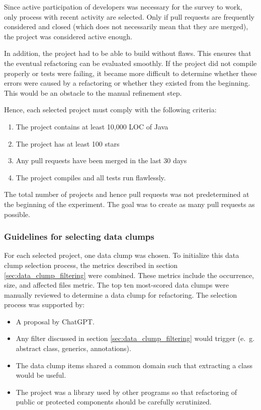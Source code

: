 Since active participation of developers was necessary for the survey to work, only process with recent activity are selected. Only if pull requests are frequently considered and closed (which does not necessarily mean that they are merged), the project was considered active enough. 

In addition, the project had to be able to build without flaws. This ensures that the eventual refactoring can be evaluated smoothly. If the project did not compile properly or tests were failing, it became more difficult to determine whether these errors were caused by a refactoring or whether they existed from the beginning. This would be an obstacle to the manual refinement step.


Hence, each selected project must comply with the following criteria:
\begin{enumerate}
    \item The project contains at least  10,000 \ac{LOC} of Java
        \item The project  has at least 100 stars
\item Any pull requests have been merged in the last 30 days
\item The project compiles and all tests run flawlessly.
\end{enumerate}


The total number of projects and hence pull requests was not predetermined at the beginning of the experiment. The goal was to create as many pull requests as possible. 


\subsubsection{Guidelines for selecting data clumps}

For each selected project, one data clump was chosen. To initialize this data clump selection process, the metrics described in section \ref{sec:data_clump_filtering} were combined. These metrics include the occurrence, size, and affected files metric. The top ten most-scored data clumps were manually reviewed to determine a data clump for refactoring. The selection process was supported by:
\begin{itemize}
\item A proposal by ChatGPT. 
    \item Any filter discussed in section \ref{sec:data_clump_filtering} would trigger (e.~g. abstract class, generics, annotations).
    \item The data clump items shared a common domain such that extracting a class would be useful. 
    \item The project was a library used by other programs so that refactoring of public or protected components should be carefully scrutinized. 
\end{itemize}

